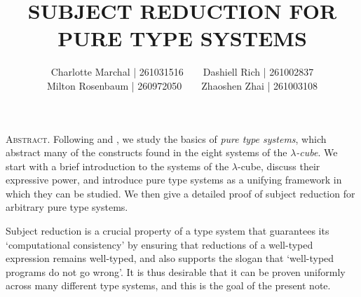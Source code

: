 \documentclass[reqno, twoside]{article}
\begin{document}
    \title{\textbf{\normalsize\MakeUppercase{Subject Reduction for Pure Type Systems}}}
    \author{\small Charlotte Marchal | 261031516\ \ \ \ Dashiell Rich | 261002837\\\small Milton Rosenbaum | 260972050\ \ \ \ Zhaoshen Zhai | 261003108}
    \date{}
    \maketitle

    \begin{center}
        \vspace{-0.3in}
        \begin{minipage}{0.85\textwidth}
            {\footnotesize{\textsc{Abstract.}} Following \cite{GN91} and \cite{Bar91}, we study the basics of \textit{pure type systems}, which abstract many of the constructs found in the eight systems of the \textit{$\lambda$-cube}. We start with a brief introduction to the systems of the $\lambda$-cube, discuss their expressive power, and introduce pure type systems as a unifying framework in which they can be studied. We then give a detailed proof of subject reduction for arbitrary pure type systems.}
        \end{minipage}
    \end{center}

    Subject reduction is a crucial property of a type system that guarantees its `computational consistency' by ensuring that reductions of a well-typed expression remains well-typed, and also supports the slogan that `well-typed programs do not go wrong'. It is thus desirable that it can be proven uniformly across many different type systems, and this is the goal of the present note.
\end{document}
